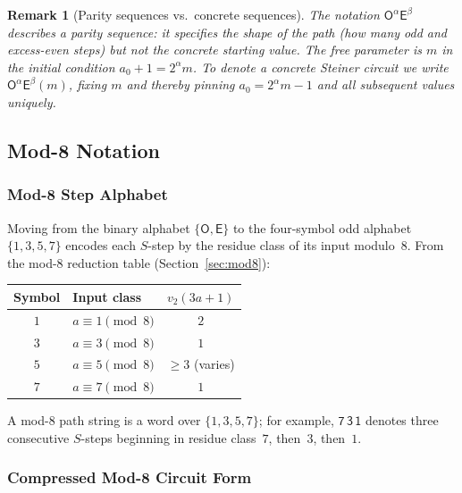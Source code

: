 \documentclass[11pt,a4paper]{article}
\theoremstyle{remark}
\theoremstyle{plain}
\newtheorem{remark}[theorem]{Remark}
\begin{document}
\begin{remark}[Parity sequences vs.\ concrete sequences]
The notation $\mathsf{O}^\alpha\mathsf{E}^\beta$ describes a \emph{parity sequence}:
it specifies the shape of the path (how many odd and excess-even steps) but not the
concrete starting value.
The free parameter is $m$ in the initial condition $a_0 + 1 = 2^\alpha m$.
To denote a \emph{concrete} Steiner circuit we write $\mathsf{O}^\alpha\mathsf{E}^\beta(m)$,
fixing $m$ and thereby pinning $a_0 = 2^\alpha m - 1$ and all subsequent values uniquely.
\end{remark}

\subsection{Mod-8 Notation}
\label{sec:mod8notation}

\subsubsection{Mod-8 Step Alphabet}
\label{sec:mod8enc}

Moving from the binary alphabet $\{\mathsf{O}, \mathsf{E}\}$ to the four-symbol
odd alphabet $\{1,3,5,7\}$ encodes each $S$-step by the residue class of its
input modulo~8.
From the mod-8 reduction table (Section~\ref{sec:mod8}):

\begin{center}
\begin{tabular}{c|l|c}
\toprule
Symbol & Input class & $v_2(3a+1)$ \\
\midrule
$1$ & $a \equiv 1 \pmod{8}$ & $2$ \\
$3$ & $a \equiv 3 \pmod{8}$ & $1$ \\
$5$ & $a \equiv 5 \pmod{8}$ & $\geq 3$ (varies) \\
$7$ & $a \equiv 7 \pmod{8}$ & $1$ \\
\bottomrule
\end{tabular}
\end{center}

A mod-8 path string is a word over $\{1,3,5,7\}$; for example, $\mathsf{7\,3\,1}$
denotes three consecutive $S$-steps beginning in residue class~$7$, then~$3$, then~$1$.

\subsubsection{Compressed Mod-8 Circuit Form}
\label{sec:compressed}
\end{document}
